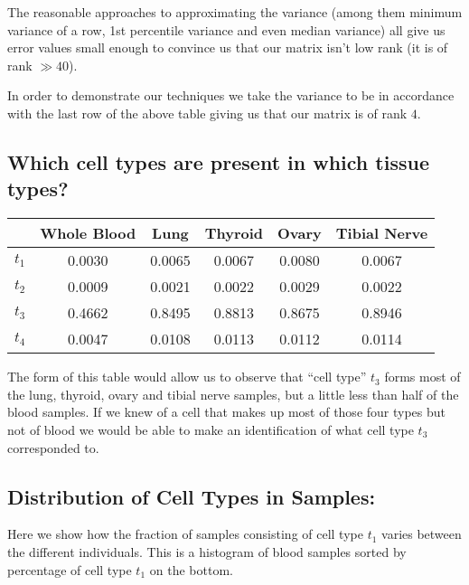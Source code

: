 \documentclass[10pt]{article}
\begin{document}
The reasonable approaches to approximating the variance (among them minimum variance of a row, 1st percentile variance and even median variance) all give us error values small enough to convince us that our matrix isn't low rank (it is of rank \(\gg 40\)).

In order to demonstrate our techniques we take the variance to be in accordance with the last row of the above table giving us that our matrix is of rank \(4\).

\subsection{Which cell types are present in which tissue types?}

\begin{center}
    \begin{tabular}{| c | c | c | c | c | c |}
    \hline
& Whole Blood& Lung & Thyroid & Ovary & Tibial Nerve \\ \hline

\(t_1\) & 0.0030 & 0.0065 & 0.0067 & 0.0080 & 0.0067 \\ \hline

\(t_2\) & 0.0009 & 0.0021 & 0.0022 & 0.0029 & 0.0022 \\ \hline

\(t_3\) & 0.4662 & 0.8495 & 0.8813 & 0.8675 & 0.8946 \\ \hline

\(t_4\) & 0.0047 & 0.0108 & 0.0113 & 0.0112 & 0.0114 \\ \hline

    \end{tabular}
\end{center}

The form of this table would allow us to observe that ``cell type'' \(t_3\) forms most of the lung, thyroid, ovary and tibial nerve samples, but a little less than half of the blood samples.
If we knew of a cell that makes up most of those four types but not of blood we would be able to make an identification of what cell type \(t_3\) corresponded to.

\subsection{Distribution of Cell Types in Samples:}
Here we show how the fraction of samples consisting of cell type \(t_1\) varies between the different individuals.
This is a histogram of blood samples sorted by percentage of cell type \(t_1\) on the bottom.
\end{document}
